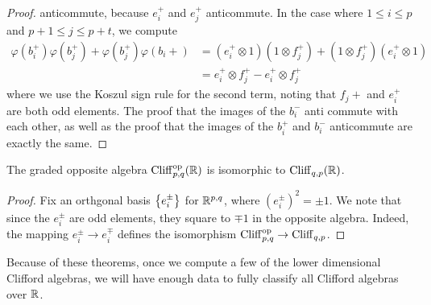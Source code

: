 \begin{proof}
anticommute, because $e_i^+$ and $e_j^+$ anticommute. In the case where
$1 \leq i \leq p$ and $p+1 \leq j \leq p+t$, we compute
%
\begin{align*}
\varphi(b_i^+)\varphi(b_j^+) + \varphi(b_j^+)\varphi(b_i+) &=
(e_i^+ \otimes 1)(1 \otimes f_j^+) + (1\otimes f_j^+)(e_i^+ \otimes 1) \\
&= e_i^+ \otimes f_j^+ - e_i^+ \otimes f_j^+
\end{align*}
where we use the Koszul sign rule for the second term, noting that $f_j+$ and
$e_i^+$ are both odd elements. The proof that the images of the $b_i^-$ anti commute with
each other, as well as the proof that the images of the $b_i^+$ and $b_i^-$
anticommute are exactly the same.
%
\end{proof}
%
\begin{thm}
The graded opposite algebra $\operatorname{Cliff}_{p,q}^{\text{op}}(\mathbb{R})$ is isomorphic to
$\operatorname{Cliff}_{q,p}(\mathbb{R})$.
\end{thm}
%
\begin{proof}
Fix an orthgonal basis $\left\lbrace e_i^\pm \right\rbrace$ for $\mathbb{R}^{p,q}$, where
$(e_i^\pm)^2 = \pm 1$. We note that since the $e_i^\pm$ are odd elements,
they square to $\mp 1$ in the opposite algebra. Indeed, the mapping
$e_i^\pm \to e_i^\mp$ defines the isomorphism
$\operatorname{Cliff}_{p,q}^\text{op} \to \operatorname{Cliff}_{q,p}$.
\end{proof}
%
Because of these theorems, once we compute a few of the lower dimensional
Clifford algebras, we will have enough data to fully classify all Clifford
algebras over $\mathbb{R}$.
%
